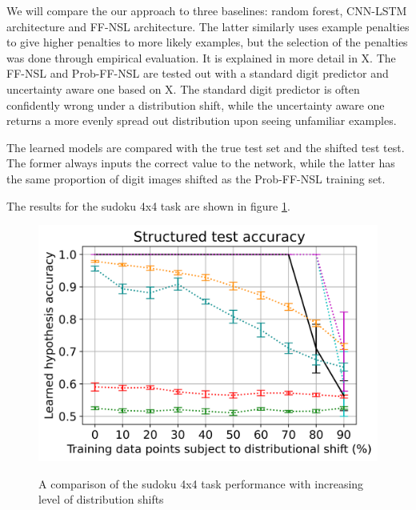 We will compare the our approach to three baselines: random forest, CNN-LSTM architecture and FF-NSL architecture. 
The latter similarly uses example penalties to give higher penalties to more likely examples, but the selection of the penalties was done through empirical evaluation.
It is explained in more detail in X.
The FF-NSL and Prob-FF-NSL are tested out with a standard digit predictor and uncertainty aware one based on X.
The standard digit predictor is often confidently wrong under a distribution shift, while the uncertainty aware one returns a more evenly spread out distribution upon seeing unfamiliar examples.

The learned models are compared with the true test set and the shifted test test.
The former always inputs the correct value to the network, while the latter has the same proportion of digit images shifted as the Prob-FF-NSL training set.

The results for the sudoku 4x4 task are shown in figure \ref{sudoku4x4-results}.

\begin{figure}[h]
\caption{A comparison of the sudoku 4x4 task performance with increasing level of distribution shifts}
\centering
\includegraphics[width=\textwidth]{logic-based-classification/sudoku_4x4_structured_test_data_results.png}
\label{sudoku4x4-results}
\end{figure}



